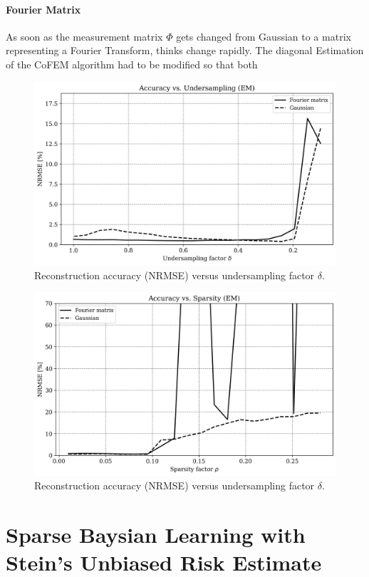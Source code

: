 \documentclass{article}
\begin{document}
\paragraph{Fourier Matrix}
As soon as the measurement matrix $\Phi$ gets changed from Gaussian to a matrix representing a Fourier Transform, thinks change rapidly. The diagonal Estimation of the CoFEM algorithm had to be modified so that both  

\begin{figure}[H]
    \centering
    \includegraphics[width=0.75\linewidth]{Figures/accuracy_vs_undersampling_FFTGauss_EM.png}
    \caption{Reconstruction accuracy (NRMSE) versus undersampling factor $ \delta $.}
    \label{fig:accuracy_vs_undersampling_EM_gaussFFT}
\end{figure}

\begin{figure}[H]
    \centering
    \includegraphics[width=0.75\linewidth]{Figures/accuracy_vs_sparsity_FFTGauss_EM.png}
    \caption{Reconstruction accuracy (NRMSE) versus undersampling factor $ \delta $.}
    \label{fig:accuracy_vs_sparsity_EM_gaussFFT}
\end{figure}


\section{Sparse Baysian Learning with Stein's Unbiased Risk Estimate}
\end{document}

